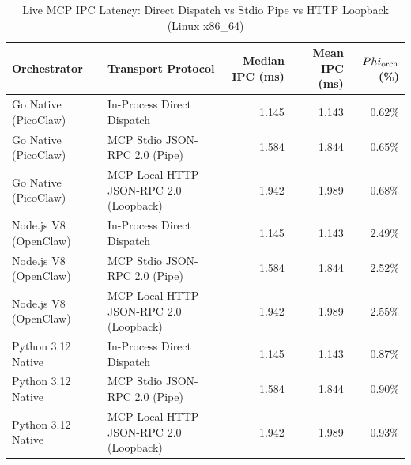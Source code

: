 \begin{table}[t]
\centering\small
\caption{Live MCP IPC Latency: Direct Dispatch vs Stdio Pipe vs HTTP Loopback (Linux x86_64)}
\label{tab:linux_mcp_transport}
\begin{tabular}{llrrr}
\toprule
Orchestrator & Transport Protocol & Median IPC (ms) & Mean IPC (ms) & $\\Phi_{\text{orch}}$ (\%) \\
\midrule
Go Native (PicoClaw) & In-Process Direct Dispatch & 1.145 & 1.143 & 0.62\% \\
Go Native (PicoClaw) & MCP Stdio JSON-RPC 2.0 (Pipe) & 1.584 & 1.844 & 0.65\% \\
Go Native (PicoClaw) & MCP Local HTTP JSON-RPC 2.0 (Loopback) & 1.942 & 1.989 & 0.68\% \\
Node.js V8 (OpenClaw) & In-Process Direct Dispatch & 1.145 & 1.143 & 2.49\% \\
Node.js V8 (OpenClaw) & MCP Stdio JSON-RPC 2.0 (Pipe) & 1.584 & 1.844 & 2.52\% \\
Node.js V8 (OpenClaw) & MCP Local HTTP JSON-RPC 2.0 (Loopback) & 1.942 & 1.989 & 2.55\% \\
Python 3.12 Native & In-Process Direct Dispatch & 1.145 & 1.143 & 0.87\% \\
Python 3.12 Native & MCP Stdio JSON-RPC 2.0 (Pipe) & 1.584 & 1.844 & 0.90\% \\
Python 3.12 Native & MCP Local HTTP JSON-RPC 2.0 (Loopback) & 1.942 & 1.989 & 0.93\% \\
\bottomrule
\end{tabular}
\end{table}
